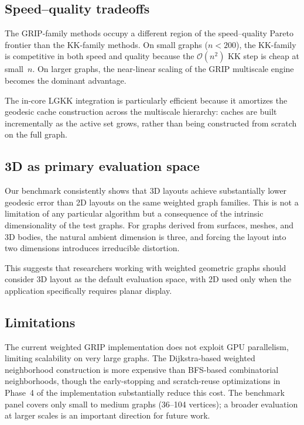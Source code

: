\documentclass[11pt,twocolumn]{article}
\newcommand{\bigO}{\mathcal{O}}
\begin{document}
\subsection{Speed--quality tradeoffs}

The GRIP-family methods occupy a different region of the
speed--quality Pareto frontier than the KK-family methods.  On small
graphs ($n < 200$), the KK-family is competitive in both speed and
quality because the $\bigO(n^2)$ KK step is cheap at small~$n$.  On
larger graphs, the near-linear scaling of the GRIP multiscale engine
becomes the dominant advantage.

The in-core LGKK integration is particularly efficient because it
amortizes the geodesic cache construction across the multiscale
hierarchy: caches are built incrementally as the active set grows, rather
than being constructed from scratch on the full graph.

\subsection{3D as primary evaluation space}

Our benchmark consistently shows that 3D layouts achieve substantially
lower geodesic error than 2D layouts on the same weighted graph families.
This is not a limitation of any particular algorithm but a consequence of
the intrinsic dimensionality of the test graphs.  For graphs derived from
surfaces, meshes, and 3D bodies, the natural ambient dimension is three,
and forcing the layout into two dimensions introduces irreducible
distortion.

This suggests that researchers working with weighted geometric graphs
should consider 3D layout as the default evaluation space, with 2D used
only when the application specifically requires planar display.

\subsection{Limitations}

The current weighted GRIP implementation does not exploit GPU parallelism,
limiting scalability on very large graphs.  The Dijkstra-based weighted
neighborhood construction is more expensive than BFS-based combinatorial
neighborhoods, though the early-stopping and scratch-reuse optimizations
in Phase~4 of the implementation substantially reduce this cost.  The
benchmark panel covers only small to medium graphs (36--104 vertices); a
broader evaluation at larger scales is an important direction for future
work.
\end{document}

